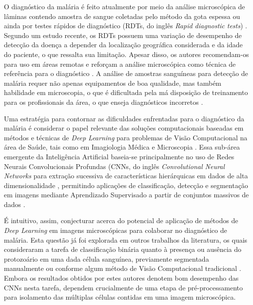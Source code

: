 O diagnóstico da malária é feito atualmente por meio da análise microscópica de lâminas contendo amostra de sangue coletadas pelo método da gota espessa ou ainda por testes rápidos de diagnóstico (RDTs, do inglês \emph{Rapid diagnostic tests}) \cite{OMS:Malaria2019}. Segundo um estudo recente, os RDTs possuem uma variação de desempenho de detecção da doença a depender da localização geográfica considerada e da idade do paciente, o que ressalta sua limitação. Apesar disso, os autores recomendam-os para uso em áreas remotas e reforçam a análise microscópica como técnica de referência para o diagnóstico \cite{Berzosa:MalariaDiagnostico}. A análise de amostras sanguíneas para detecção de malária requer não apenas equipamentos de boa qualidade, mas também habilidade em microscopia, o que é dificultada pela má disposição de treinamento para os profissionais da área, o que enseja diagnósticos incorretos \cite{Paz:Habilidade}.

Uma estratégia para contornar as dificuldades enfrentadas para o diagnóstico da malária é considerar o papel relevante das soluções computacionais baseadas em métodos e técnicas de \emph{Deep Learning} para problemas de Visão Computacional na área de Saúde, tais como em Imagiologia Médica e  Microscopia \cite{Shen:SurveyMedico,Lee:SurveyMedico,Xing:SurveyMedico}. Essa sub-área emergente da Inteligência Artificial baseia-se principalmente no uso de Redes Neurais Convolucionais Profundas (CNNs, do inglês \emph{Convolutional Neural Networks} para extração sucessiva de características hierárquicas em dados de alta dimensionalidade \cite{Goodfellow:Livro}, permitindo aplicações de classificação, detecção e segmentação em imagens mediante Aprendizado Supervisado a partir de conjuntos massivos de dados \cite{Chollet:2017,Khan:2018}.

É intuitivo, assim, conjecturar acerca do potencial de aplicação de métodos de \emph{Deep Learning} em imagens microscópicas para colaborar no diagnóstico de malária. Esta questão já foi explorada em outros trabalhos da literatura, os quais consideraram a tarefa de classificação binária quanto à presença ou ausência do protozoário em uma dada célula sanguínea, previamente segmentada manualmente ou conforme algum método de Visão Computacional tradicional \cite{Felipe:2022,Yang:2020}. Embora os resultados obtidos por estes autores denotem bom desempenho das CNNs nesta tarefa, dependem crucialmente de uma etapa de pré-processamento para isolamento das múltiplas células contidas em uma imagem microscópica.


